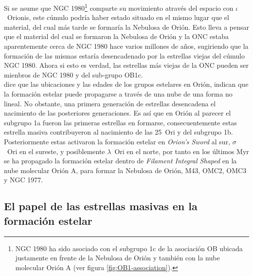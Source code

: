 Si se asume que NGC 1980\footnote{NGC 1980 ha sido asociado con el subgrupo 1c de la asociación OB ubicada justamente en frente de la Nebulosa de Orión y también con la nube molecular Orión A (ver figura \ref{fig:OB1-association}).} comparte su movimiento através del espacio con \(\iota\)~Orionis, este cúmulo podría haber estado situado en el mismo lugar que el material, del cual más tarde se formaría la Nebulosa de Orión. Esto lleva a pensar que el material del cual se formaron la Nebulosa de Orión y la ONC estaba aparentemente cerca de NGC 1980 hace varios millones de años, sugiriendo que la formación de las mismas estaría desencadenado por la estrellas viejas del cúmulo NGC 1980. Ahora si esto es verdad, las estrellas más viejas de la ONC pueden ser mienbros de NGC 1980 y del sub-grupo OB1c.\\

\citet{Bally:2008a} dice que las ubicaciones y las edades de los grupos estelares en Orión, indican que la formación estelar puede propagarse a través de una nube de una forma no lineal. No obstante, una primera generación de estrellas desencadena el nacimiento de las posteriores generaciones. Es así que en Orión al parecer el subgrupo 1a fueron las primeras estrellas en formarse, consecuentemente estas estrella masiva contribuyeron al nacimiento de las 25~Ori y del subgrupo 1b. Posteriormente estas activaron la formación estelar en \textit{Orion's Sword} al sur, \(\sigma\)~Ori en el sureste, y posiblemente \(\lambda\)~Ori en el norte, por tanto en los últimos Myr se ha propagado la formación estelar dentro de \textit{Filament Integral Shaped} en la nube molecular Orión A, para formar la Nebulosa de Orión, M43, OMC2, OMC3 y NGC 1977.\\ 

\subsection{El papel de las estrellas masivas en la formación estelar}
\label{sec:star-masivas}

